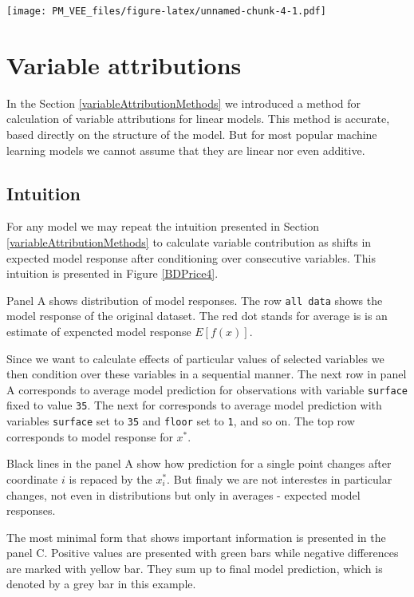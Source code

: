 \documentclass[]{krantz}
\theoremstyle{definition}
\theoremstyle{definition}
\theoremstyle{definition}
\theoremstyle{remark}
\begin{document}
\texttt{[image: PM\_VEE\_files/figure-latex/unnamed-chunk-4-1.pdf]}

\hypertarget{breakDown}{%
\section{Variable attributions}\label{breakDown}}

In the Section \ref{variableAttributionMethods} we introduced a method
for calculation of variable attributions for linear models. This method
is accurate, based directly on the structure of the model. But for most
popular machine learning models we cannot assume that they are linear
nor even additive.

\hypertarget{intuition-1}{%
\subsection{Intuition}\label{intuition-1}}

For any model we may repeat the intuition presented in Section
\ref{variableAttributionMethods} to calculate variable contribution as
shifts in expected model response after conditioning over consecutive
variables. This intuition is presented in Figure \ref{BDPrice4}.

Panel A shows distribution of model responses. The row
\texttt{all\ data} shows the model response of the original dataset. The
red dot stands for average is is an estimate of expencted model response
\(E [f(x)]\).

Since we want to calculate effects of particular values of selected
variables we then condition over these variables in a sequential manner.
The next row in panel A corresponds to average model prediction for
observations with variable \texttt{surface} fixed to value \texttt{35}.
The next for corresponds to average model prediction with variables
\texttt{surface} set to \texttt{35} and \texttt{floor} set to
\texttt{1}, and so on. The top row corresponds to model response for
\(x^*\).

Black lines in the panel A show how prediction for a single point
changes after coordinate \(i\) is repaced by the \(x^*_i\). But finaly
we are not interestes in particular changes, not even in distributions
but only in averages - expected model responses.

The most minimal form that shows important information is presented in
the panel C. Positive values are presented with green bars while
negative differences are marked with yellow bar. They sum up to final
model prediction, which is denoted by a grey bar in this example.
\end{document}
